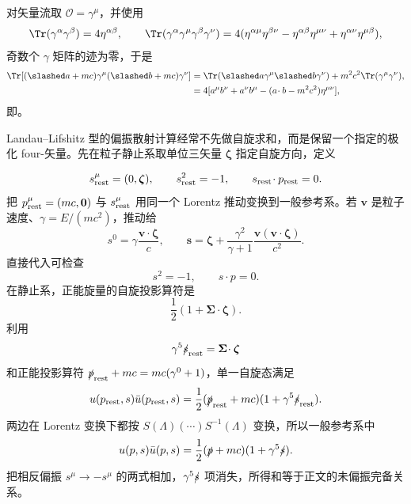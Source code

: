 \begin{derivation}
对矢量流取 $\mathcal O=\gamma^\mu$，并使用
\begin{equation*}
 \Tr(\gamma^\alpha\gamma^\beta)=4\eta^{\alpha\beta},
 \qquad
 \Tr(\gamma^\alpha\gamma^\mu\gamma^\beta\gamma^\nu)
 =4(\eta^{\alpha\mu}\eta^{\beta\nu}
 -\eta^{\alpha\beta}\eta^{\mu\nu}
 +\eta^{\alpha\nu}\eta^{\mu\beta}),
\end{equation*}
奇数个 $\gamma$ 矩阵的迹为零，于是
\begin{align*}
 \Tr[(\slashed a+mc)\gamma^\mu(\slashed b+mc)\gamma^\nu]
 &=\Tr(\slashed a\gamma^\mu\slashed b\gamma^\nu)
 +m^2c^2\Tr(\gamma^\mu\gamma^\nu),\\
 &=4[a^\mu b^\nu+a^\nu b^\mu-(a\!\cdot b-m^2c^2)\eta^{\mu\nu}],
\end{align*}
即。
\end{derivation}

\begin{derivation}
Landau--Lifshitz 型的偏振散射计算经常不先做自旋求和，而是保留一个指定的极化 four-矢量。先在粒子静止系取单位三矢量 $\boldsymbol\zeta$ 指定自旋方向，定义

\begin{equation*}
 s_{\rm rest}^\mu=(0,\boldsymbol\zeta),
 \qquad
 s_{\rm rest}^2=-1,
 \qquad
 s_{\rm rest}\!\cdot p_{\rm rest}=0.
\end{equation*}
把 $p_{\rm rest}^\mu=(mc,\mathbf0)$ 与 $s_{\rm rest}^\mu$ 用同一个 Lorentz 推动变换到一般参考系。若 $\mathbf v$ 是粒子速度、$\gamma=E/(mc^2)$，推动给
\begin{equation*}
 {
 s^0=\gamma\frac{\mathbf v\!\cdot\boldsymbol\zeta}{c},
 \qquad
 \mathbf s
 =\boldsymbol\zeta
 +\frac{\gamma^2}{\gamma+1}
 \frac{\mathbf v(\mathbf v\!\cdot\boldsymbol\zeta)}{c^2}.}
 \end{equation*}
直接代入可检查
\begin{equation*}
 s^2=-1,
 \qquad
 s\!\cdot p=0.
\end{equation*}
在静止系，正能旋量的自旋投影算符是
\begin{equation*}
 \frac12(1+\boldsymbol\Sigma\!\cdot\boldsymbol\zeta).
\end{equation*}
利用
\begin{equation*}
 \gamma^5\slashed s_{\rm rest}
 =\boldsymbol\Sigma\!\cdot\boldsymbol\zeta
\end{equation*}
和正能投影算符 $\slashed p_{\rm rest}+mc=mc(\gamma^0+1)$，单一自旋态满足
\begin{equation*}
 u(p_{\rm rest},s)\bar u(p_{\rm rest},s)
 =\frac12(\slashed p_{\rm rest}+mc)
 (1+\gamma^5\slashed s_{\rm rest}).
\end{equation*}
两边在 Lorentz 变换下都按 $S(\Lambda)(\cdots)S^{-1}(\Lambda)$ 变换，所以一般参考系中
\begin{equation*}
 {
 u(p,s)\bar u(p,s)
 =\frac12(\slashed p+mc)(1+\gamma^5\slashed s).}
 \end{equation*}
把相反偏振 $s^\mu\to-s^\mu$ 的两式相加，$\gamma^5\slashed s$ 项消失，所得和等于正文的未偏振完备关系。
\end{derivation}

